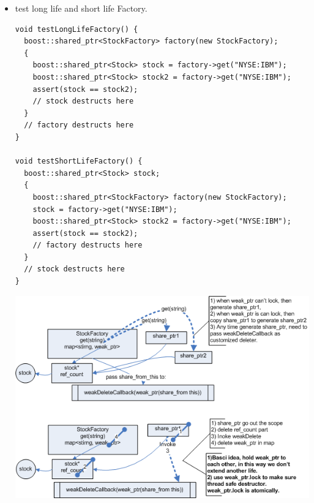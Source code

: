 \documentclass[a4paper,11pt,twoside]{book}
\begin{document}
\begin{itemize}
		\item test long life and short life Factory.
\begin{lstlisting}
void testLongLifeFactory() {
  boost::shared_ptr<StockFactory> factory(new StockFactory);
  {
    boost::shared_ptr<Stock> stock = factory->get("NYSE:IBM");
    boost::shared_ptr<Stock> stock2 = factory->get("NYSE:IBM");
    assert(stock == stock2);
    // stock destructs here
  }
  // factory destructs here
}

void testShortLifeFactory() {
  boost::shared_ptr<Stock> stock;
  {
    boost::shared_ptr<StockFactory> factory(new StockFactory);
    stock = factory->get("NYSE:IBM");
    boost::shared_ptr<Stock> stock2 = factory->get("NYSE:IBM");
    assert(stock == stock2);
    // factory destructs here
  }
  // stock destructs here
}
\end{lstlisting}
	\begin{center}	
		\includegraphics[width=0.90\linewidth]{pics/weak_ptr.png}
		\end{center}

\end{itemize}




	
\end{document}
